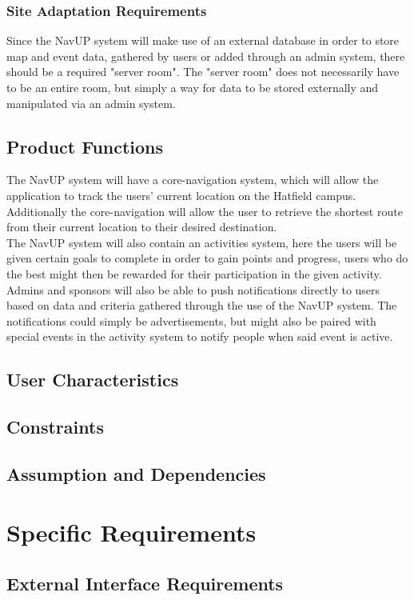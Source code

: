 \documentclass[a4paper,12pt]{article}
\begin{document}
\subsubsection{Site Adaptation Requirements}
Since the NavUP system will make use of an external database in order to store map and event data, gathered by users or added through an admin system, there should be a required "server room". The "server room" does not necessarily have to be an entire room, but simply a way for data to be stored externally and manipulated via an admin system.
\subsection{Product Functions}
The NavUP system will have a core-navigation system, which will allow the application to track the users' current location on the Hatfield campus. Additionally the core-navigation will allow the user to retrieve the shortest route from their current location to their desired destination.\\
The NavUP system will also contain an activities system, here the users will be given certain goals to complete in order to gain points and progress, users who do the best might then be rewarded for their participation in the given activity.\\
Admins and sponsors will also be able to push notifications directly to users based on data and criteria gathered through the use of the NavUP system. The notifications could simply be advertisements, but might also be paired with special events in the activity system to notify people when said event is active.
\subsection{User Characteristics}
\subsection{Constraints}
\subsection{Assumption and Dependencies}

\section{Specific Requirements}
\subsection{External Interface Requirements}
\end{document}
